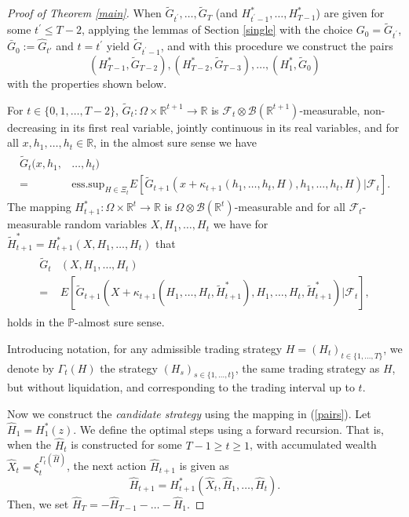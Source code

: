 \documentclass[a4paper]{article}
\begin{document}
\begin{proof}[Proof of Theorem \ref{main}]
When $\tilde{G}_{t^{'}}, \ldots, \tilde{G}_{T}$ 
(and $H^*_{t^{'}-1}, \ldots, H^*_{T-1}$) are given for some $t^{'} \leq T-2$, applying the lemmas of Section  
\ref{single} with the choice $G_{0} = \tilde{G}_{t^{'}}$, $\bar{G}_{0}:=\hat{G}_{t'}$ and $t = t^{'}$ 
yield $\tilde{G}_{t^{'}-1}$, and with this procedure we construct the pairs
\begin{equation}\label{pairs}
(H^{*}_{T-1}, \tilde{G}_{T-2}), (H^{*}_{T-2}, \tilde{G}_{T-3}), \ldots, (H^{*}_1,\tilde{G}_{0})
\end{equation}
with the properties shown below.


For $t \in \{0,1, \ldots, T-2\}$, $\tilde{G}_{t}:\Omega \times \mathbb{R}^{t+1} \to \mathbb{R}$ is 
$\mathcal{F}_{t} \otimes \mathcal{B}(\mathbb{R}^{t+1})$-measurable, non-decreasing in its first 
real variable, jointly continuous in its real variables, and for all $x, h_1, \ldots, h_{t} \in \mathbb{R}$, 
in the almost sure sense we have
\begin{align*}
\begin{split}
\tilde{G}_{t}(x, h_1,& \ldots, h_{t})
\\
=&
\mbox{ess.sup}_{H \in \Xi_{t}}E\left[\tilde{G}_{t+1}(x + \kappa_{t+1}(h_1,\ldots,h_{t},H), h_1, \ldots, h_{t}, H) \vert \mathcal{F}_t \right].
\end{split}
\end{align*}
The mapping $H^{*}_{t+1}:\Omega \times \mathbb{R}^{t} \to \mathbb{R}$ is $\Omega \otimes \mathcal{B}(\mathbb{R}^{t})$-measurable 
and for all $\mathcal{F}_{t}$-measurable random variables $X, H_1, \ldots, H_{t}$ we have for 
$\tilde H^{*}_{t+1}= H^{*}_{t+1}(X, H_1, \ldots, H_{t})$ that
\begin{align}\label{zenta}
\begin{split}
\tilde{G}_{t}&(X, H_1, \ldots, H_{t}) 
\\
=&
E\left[\tilde{G}_{t+1}(X + \kappa_{t+1}(H_1,\ldots,H_t, \tilde H^*_{t+1}), H_1, \ldots, H_{t}, 
\tilde H^{*}_{t+1}) \vert \mathcal{F}_t \right],
\end{split}
\end{align}
holds in the $\mathbb{P}$-almost sure sense. 


Introducing notation, for any admissible trading strategy $H = (H_t)_{t \in \{1, \ldots, T \} }$, we denote by 
$\Gamma_t( H)$ the strategy $( H_s)_{s \in \{1, \ldots, t\}}$, the same trading strategy as $H$, but without liquidation, 
and corresponding to the trading interval up to $t$.

Now we construct the \emph{candidate strategy} using the mapping in (\ref{pairs}). Let $\hat H_1 = H^{*}_1(z)$. 
We define the optimal steps using a forward recursion. That is, when the $\hat H_t$ is constructed for 
some $T -1 \geq t \geq 1$, with accumulated wealth $\hat X_{t} = \xi_{t}^{\Gamma_t(\hat H)}$, the 
next action $\hat H_{t+1}$ is given as
\begin{equation}\label{anyulontul}
\hat H_{t+1} = H^{*}_{t+1}(\hat X_t, \hat H_{1}, \ldots, \hat H_{t}).
\end{equation}
Then, we set $\hat H_T = -\hat H_{T-1} - \ldots - \hat H_1$.



\end{proof}
\end{document}
